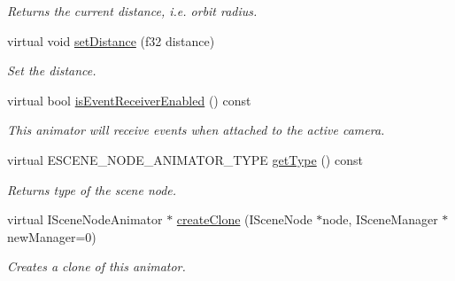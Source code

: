 \begin{DoxyCompactItemize}
\begin{DoxyCompactList}\small\item\em Returns the current distance, i.\-e. orbit radius. \end{DoxyCompactList}\item 
\hypertarget{classirr_1_1scene_1_1_c_scene_node_animator_camera_maya_a7d15bbcff2dd3d3ef8307db8b711da15}{virtual void \hyperlink{classirr_1_1scene_1_1_c_scene_node_animator_camera_maya_a7d15bbcff2dd3d3ef8307db8b711da15}{set\-Distance} (f32 distance)}\label{classirr_1_1scene_1_1_c_scene_node_animator_camera_maya_a7d15bbcff2dd3d3ef8307db8b711da15}

\begin{DoxyCompactList}\small\item\em Set the distance. \end{DoxyCompactList}\item 
\hypertarget{classirr_1_1scene_1_1_c_scene_node_animator_camera_maya_af93f7865d7f4779ca166fd94c48467e6}{virtual bool \hyperlink{classirr_1_1scene_1_1_c_scene_node_animator_camera_maya_af93f7865d7f4779ca166fd94c48467e6}{is\-Event\-Receiver\-Enabled} () const }\label{classirr_1_1scene_1_1_c_scene_node_animator_camera_maya_af93f7865d7f4779ca166fd94c48467e6}

\begin{DoxyCompactList}\small\item\em This animator will receive events when attached to the active camera. \end{DoxyCompactList}\item 
\hypertarget{classirr_1_1scene_1_1_c_scene_node_animator_camera_maya_a423f4ee2b46b4ef5e5ea50354f9145de}{virtual E\-S\-C\-E\-N\-E\-\_\-\-N\-O\-D\-E\-\_\-\-A\-N\-I\-M\-A\-T\-O\-R\-\_\-\-T\-Y\-P\-E \hyperlink{classirr_1_1scene_1_1_c_scene_node_animator_camera_maya_a423f4ee2b46b4ef5e5ea50354f9145de}{get\-Type} () const }\label{classirr_1_1scene_1_1_c_scene_node_animator_camera_maya_a423f4ee2b46b4ef5e5ea50354f9145de}

\begin{DoxyCompactList}\small\item\em Returns type of the scene node. \end{DoxyCompactList}\item 
virtual I\-Scene\-Node\-Animator $\ast$ \hyperlink{classirr_1_1scene_1_1_c_scene_node_animator_camera_maya_a45c7475814dc984e663413c4f23d6e7a}{create\-Clone} (I\-Scene\-Node $\ast$node, I\-Scene\-Manager $\ast$new\-Manager=0)
\begin{DoxyCompactList}\small\item\em Creates a clone of this animator. \end{DoxyCompactList}\end{DoxyCompactItemize}


